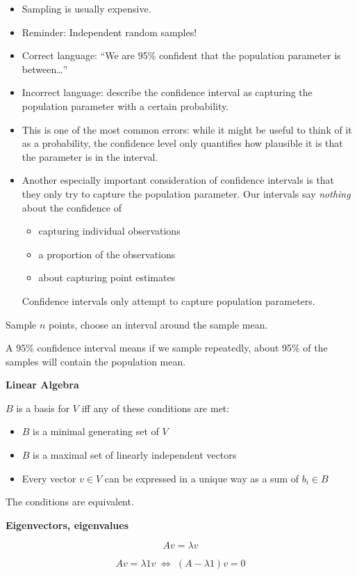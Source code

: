 \begin{enumerate}
  \begin{itemize}
  \item Sampling is usually expensive.
  \item Reminder:  Independent random samples!
  \item
    Correct language: ``We are 95\% confident that the population
    parameter is between\dots''
  \item
    Incorrect language: describe the confidence interval as capturing
    the population parameter with a certain probability.
  \item
    This is one of the most common errors: while it might be useful to
    think of it as a probability, the confidence level only quantifies
    how plausible it is that the parameter is in the interval.
  \item
    Another especially important consideration of confidence intervals
    is that they only try to capture the population parameter. Our
    intervals say \textit{nothing} about the confidence of
    \begin{itemize}
    \item capturing individual observations
    \item a proportion of the observations
    \item about capturing point estimates
    \end{itemize}
    Confidence intervals only attempt to capture population
    parameters.
  \end{itemize}
\end{enumerate}

Sample $n$ points, choose an interval around the sample mean.

A 95\% confidence interval means if we sample repeatedly, about 95\%
of the samples will contain the population mean.


\textbf{Linear Algebra}

$B$ is a basis for $V$ iff any of these conditions are met:
\begin{itemize}
\item $B$ is a minimal generating set of $V$
\item $B$ is a maximal set of linearly independent vectors
\item Every vector $v\in V$ can be expressed in a unique way as a sum of $b_i\in B$
\end{itemize}
The conditions are equivalent.

\textbf{Eigenvectors, eigenvalues}

\begin{displaymath}
  Av = \lambda v
\end{displaymath}

\begin{displaymath}
  Av = \lambda 1 v \;\iff\; (A-\lambda 1)v = 0
\end{displaymath}



